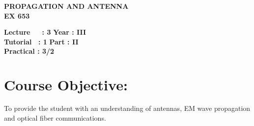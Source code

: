 \begin{center}
    \textbf{\huge{\uppercase{Propagation and Antenna}}}
    \\
    \vspace{.5cm}
    \textbf{\large{EX 653}}
\end{center}

\noindent\textbf{Lecture\ \ \ : 3} \hfill \textbf{Year : III} \\
\textbf{Tutorial \ : 1} \hfill \textbf{Part : II } \\
\textbf{Practical : 3/2}  \\

\par
\noindent 
\section*{Course Objective:}
To provide the student with an understanding of antennas, EM wave propagation and optical fiber communications.

